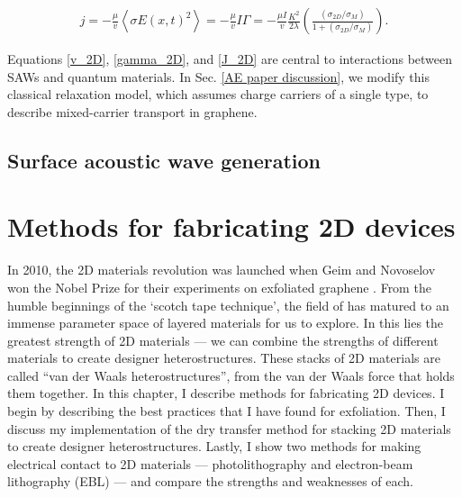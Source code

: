 \documentclass[double,12pt,1in]{beavtex}
\begin{document}
\begin{equation}
    \begin{split}
        j = - \frac{\mu}{v}\left\langle\sigma E(x,t)^2\right\rangle = - \frac{\mu}{v} I\Gamma = - \frac{\mu I}{v} \frac{K^2}{2\lambda}(\frac{(\sigma_{2D}/\sigma_M)}{1+(\sigma_{2D}/\sigma_M)}). 
    \end{split}
    \label{J_2D}
\end{equation}

Equations \ref{v_2D}, \ref{gamma_2D}, and \ref{J_2D} are central to interactions between SAWs and quantum materials. In Sec. \ref{AE paper discussion}, we modify this classical relaxation model, which assumes charge carriers of a single type, to describe mixed-carrier transport in graphene.


\section{Surface acoustic wave generation}








\chapter{Methods for fabricating 2D devices}

In 2010, the 2D materials revolution was launched when Geim and Novoselov won the Nobel Prize for their experiments on exfoliated graphene \cite{novoselov_electric_2004}. From the humble beginnings of the ‘scotch tape technique’, the field of has matured to an immense parameter space of layered materials for us to explore. In this lies the greatest strength of 2D materials — we can combine the strengths of different materials to create designer heterostructures. These stacks of 2D materials are called “van der Waals heterostructures”, from the van der Waals force that holds them together. In this chapter, I describe methods for fabricating 2D devices. I begin by describing the best practices that I have found for exfoliation. Then, I discuss my implementation of the dry transfer method for stacking 2D materials to create designer heterostructures. Lastly, I show two methods for making electrical contact to 2D materials — photolithography and electron-beam lithography (EBL) — and compare the strengths and weaknesses of each.
\end{document}
